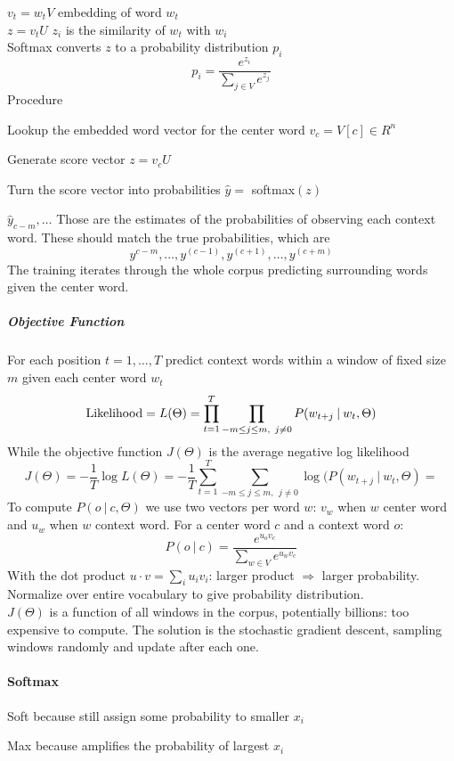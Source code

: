 \documentclass[10pt]{report}
\begin{document}
$v_t = w_tV$ embedding of word $w_t$\\$z=v_tU$ $z_i$ is the similarity of $w_t$ with $w_i$\\Softmax converts $z$ to a probability distribution $p_i$ $$p_i=\frac{e^{z_i}}{\sum_{j\in V}e^{z_j}}$$
Procedure
\begin{list}{}{}
	\item Lookup the embedded word vector for the center word $v_c = V[c] \in R^n$
	\item Generate score vector $z = v_cU$
	\item Turn the score vector into probabilities $\hat{y} =$ softmax$(z)$
\end{list}
$\hat{y}_{c-m},\ldots$ Those are the estimates of the probabilities of observing each context word. These should match the true probabilities, which are $$y^{c-m},\ldots, y^{(c-1)}, y^{(c+1)}, \ldots, y^{(c+m)}$$
The training iterates through the whole corpus predicting surrounding words given the center word.
\subparagraph{Objective Function} For each position $t=1,\ldots,T$ predict context words within a window of fixed size $m$ given each center word $w_t$ $$\hbox{Likelihood} = L(\Theta) = \prod_{t=1}^T\prod_{-m\leq j\leq m,\:\:j\neq 0} P(w_{t+j}\:|\:w_t,\Theta)$$
While the objective function $J(\Theta)$ is the average negative log likelihood $$J(\Theta) = -\frac{1}{T}\log L(\Theta) = -\frac{1}{T}\sum_{t=1}^T\sum_{-m\leq j\leq m,\:\:j\neq 0} \log(P(w_{t+j}\:|\:w_t,\Theta)=$$
To compute $P(o\:|\:c, \Theta)$ we use two vectors per word $w$: $v_w$ when $w$ center word and $u_w$ when $w$ context word. For a center word $c$ and a context word $o$:$$P(o\:|\:c) = \frac{e^{u_o v_c}}{\sum_{w\in V} e^{u_w v_c}}$$
With the dot product $u\cdot v = \sum_i u_iv_i$: larger product $\Rightarrow$ larger probability. Normalize over entire vocabulary to give probability distribution.\\
$J(\Theta)$ is a function of all windows in the corpus, potentially billions: too expensive to compute. The solution is the stochastic gradient descent, sampling windows randomly and update after each one.
\paragraph{Softmax}\begin{list}{}{}
	\item Soft because still assign some probability to smaller $x_i$
	\item Max because amplifies the probability of largest $x_i$
\end{list}
\end{document}
